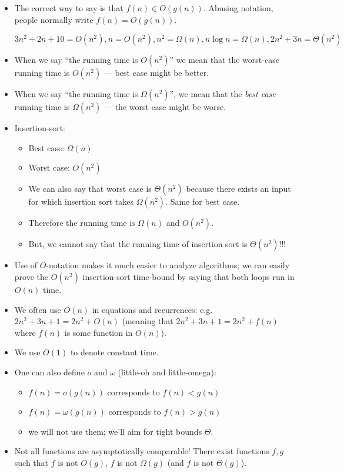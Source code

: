 \documentclass[11pt]{article}
\begin{document}
\begin{itemize}
\item The correct way to say is that $f(n) \in O(g(n))$.  Abusing
notation, people normally write $f(n) = O(g(n))$.

$$3n^2 + 2n + 10 = O(n^2), n=O(n^2), n^2 = \Omega(n), n\log n = \Omega(n), 2n^2 +3n = \Theta(n^2)$$

  \item When we say ``the running time is $O(n^2)$'' we mean that the
  worst-case running time is $O(n^2)$ --- best case might be better.

  \item When we say ``the running time is $\Omega(n^2)$'', we mean that the
  {\em best case} running time is $\Omega(n^2)$ --- the worst case might be
  worse.

  \item Insertion-sort:
  \begin{itemize}
  	\item Best case: $\Omega(n)$
  	\item Worst case: $O(n^2)$
	\item We can also say that worst case is $\Theta(n^2)$ because there exists an input for which insertion sort takes $\Omega(n^2)$. Same for best case. 
	\item 	Therefore the running time is $\Omega(n)$ and $O(n^2)$. 
	\item But, we cannot say that the running time of insertion sort is $\Theta(n^2)$!!!
 \end{itemize}


  \item Use of $O$-notation makes it much easier to analyze
  algorithms; we can easily prove the $O(n^2)$ insertion-sort time
  bound by saying that both loops run in $O(n)$ time.

  \item We often use $O(n)$ in equations and recurrences:
    e.g. $2n^2+3n+1=2n^2+O(n)$ (meaning that $2n^2+3n+1=2n^2+f(n)$
    where $f(n)$ is some function in $O(n)$).  

\item We use $O(1)$ to denote constant time.

\item One can also define $o$ and $\omega$ (little-oh and little-omega):
     \begin{itemize}
     \item $f(n)=o(g(n))$ corresponds to $f(n)<g(n)$
     \item $f(n)=\omega(g(n))$ corresponds to $f(n)>g(n)$
     \item we will not use them; we'll aim for tight bounds $\Theta$.	
     \end{itemize}

\item Not all functions are asymptotically comparable! There exist
functions $f,g$ such that $f$ is not $O(g)$, $f$ is not $\Omega(g)$
(and $f$ is not $\Theta(g)$).
\end{itemize}
\end{document}
